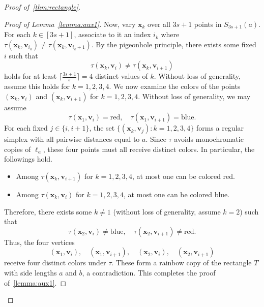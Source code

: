 \documentclass[11pt]{article}
\theoremstyle{definition}
\newcommand{\ceil}[1]{\lceil #1\rceil}
\begin{document}
\begin{proof}[Proof of~\cref{thm:rectangle}]
\begin{proof}[Proof of Lemma~\ref{lemma:aux1}]
Now, vary \(\boldsymbol{x}_k\) over all \(3s+1\) points in \(S_{3s+1}(a)\). For each \(k\in [3s+1]\), associate to it an index \(i_k\) where \(\tau(\boldsymbol{x}_k, \boldsymbol{v}_{i_k}) \ne \tau(\boldsymbol{x}_k, \boldsymbol{v}_{i_k+1})\). By the pigeonhole principle, there exists some fixed \(i\) such that
\[
\tau(\boldsymbol{x}_k, \boldsymbol{v}_i) \ne \tau(\boldsymbol{x}_k, \boldsymbol{v}_{i+1})
\]
holds for at least \(\ceil{\frac{3s+1}{s}}=4\) distinct values of \(k\). Without loss of generality, assume this holds for \(k = 1, 2, 3, 4\). We now examine the colors of the points \((\boldsymbol{x}_k, \boldsymbol{v}_i)\) and \((\boldsymbol{x}_k, \boldsymbol{v}_{i+1})\) for \(k = 1, 2, 3, 4\). Without loss of generality, we may assume
\[
\tau(\boldsymbol{x}_1, \boldsymbol{v}_i) = \text{red}, \quad \tau(\boldsymbol{x}_1, \boldsymbol{v}_{i+1}) = \text{blue}.
\]
For each fixed \(j \in \{i, i+1\}\), the set \(\{(\boldsymbol{x}_k, \boldsymbol{v}_j) : k = 1, 2, 3, 4\}\) forms a regular simplex with all pairwise distances equal to \(a\). Since \(\tau\) avoids monochromatic copies of \(\ell_a\), these four points must all receive distinct colors. In particular, the followings hold.
\begin{itemize}
    \item Among \(\tau(\boldsymbol{x}_k, \boldsymbol{v}_{i+1})\) for \(k = 1, 2, 3, 4\), at most one can be colored red.
    \item Among \(\tau(\boldsymbol{x}_k, \boldsymbol{v}_i)\) for \(k = 1, 2, 3, 4\), at most one can be colored blue.
\end{itemize}
Therefore, there exists some \(k \ne 1\) (without loss of generality, assume \(k = 2\)) such that
\[
\tau(\boldsymbol{x}_2, \boldsymbol{v}_i) \ne \text{blue}, \quad \tau(\boldsymbol{x}_2, \boldsymbol{v}_{i+1}) \ne \text{red}.
\]
Thus, the four vertices
\[
(\boldsymbol{x}_1, \boldsymbol{v}_i), \quad (\boldsymbol{x}_1, \boldsymbol{v}_{i+1}), \quad (\boldsymbol{x}_2, \boldsymbol{v}_i), \quad (\boldsymbol{x}_2, \boldsymbol{v}_{i+1})
\]
receive four distinct colors under \(\tau\). These form a rainbow copy of the rectangle \(T\) with side lengths \(a\) and \(b\), a contradiction. This completes the proof of~\cref{lemma:aux1}.
\end{proof}

\end{proof}
\end{document}
